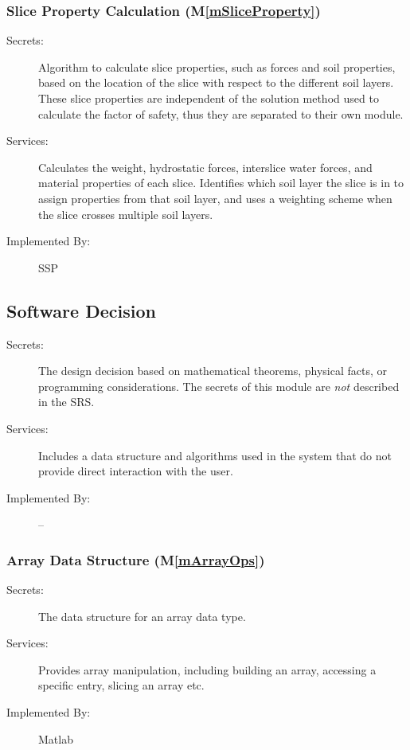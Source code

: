\documentclass[12pt, titlepage]{article}
\newcommand{\progname}{SSP}
\newcommand{\mref}[1]{M\ref{#1}}
\begin{document}
\subsubsection{Slice Property Calculation (\mref{mSliceProperty})}
\begin{description}
\item[Secrets:] Algorithm to calculate slice properties, such as forces and 
soil properties, based on the location of the slice with respect to the 
different soil layers. These slice properties are independent of the solution 
method used to calculate the factor of safety, thus they are separated to their 
own module.
\item[Services:] Calculates the weight, hydrostatic forces, interslice water 
forces, and material properties of each slice. Identifies which soil layer the 
slice is in to assign properties from that soil layer, and uses a weighting 
scheme when the slice crosses multiple soil layers.
\item[Implemented By:] \progname
\end{description} 


\subsection{Software Decision}

\begin{description}
\item[Secrets:] The design decision based on mathematical theorems,
  physical facts, or programming considerations. The secrets of this
  module are \emph{not} described in the SRS.
\item[Services:] Includes a data structure and algorithms used in the
  system that do not provide direct interaction with the user.
\item[Implemented By:] --
\end{description}


\subsubsection{Array Data Structure (\mref{mArrayOps})}

\begin{description}
\item[Secrets:] The data structure for an array data type.
\item[Services:] Provides array manipulation, including building an
  array, accessing a specific entry, slicing an array etc.
\item[Implemented By:] Matlab
\end{description}
\end{document}

